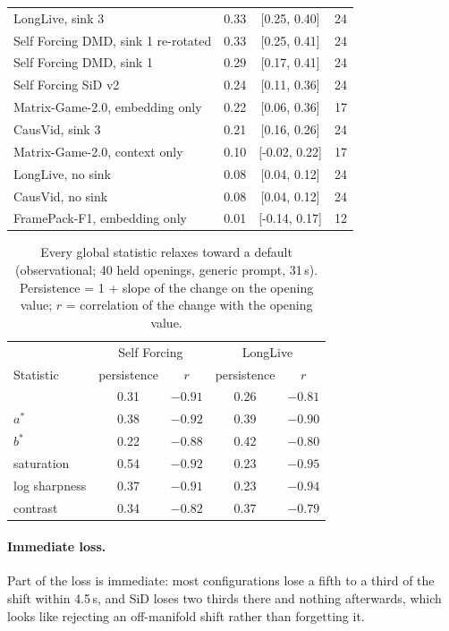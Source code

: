 \begin{table}[h]
\begin{tabular}{@{}lccc@{}}
LongLive, sink 3 & 0.33 & [0.25, 0.40] & 24 \\
Self Forcing DMD, sink 1 re-rotated & 0.33 & [0.25, 0.41] & 24 \\
Self Forcing DMD, sink 1 & 0.29 & [0.17, 0.41] & 24 \\
Self Forcing SiD v2 & 0.24 & [0.11, 0.36] & 24 \\
Matrix-Game-2.0, embedding only & 0.22 & [0.06, 0.36] & 17 \\
CausVid, sink 3 & 0.21 & [0.16, 0.26] & 24 \\
Matrix-Game-2.0, context only & 0.10 & [-0.02, 0.22] & 17 \\
LongLive, no sink & 0.08 & [0.04, 0.12] & 24 \\
CausVid, no sink & 0.08 & [0.04, 0.12] & 24 \\
FramePack-F1, embedding only & 0.01 & [-0.14, 0.17] & 12 \\
\bottomrule
\end{tabular}
\end{table}

\begin{table}[h]
\centering\small
\caption{Every global statistic relaxes toward a default (observational; 40 held openings, generic prompt, 31\,s).
Persistence = 1 + slope of the change on the opening value; $r$ = correlation of the change with the opening value.}
\label{tab:attr}
\begin{tabular}{lcccc}
\toprule
& \multicolumn{2}{c}{Self Forcing} & \multicolumn{2}{c}{LongLive} \\
Statistic & persistence & $r$ & persistence & $r$ \\
\midrule
\Lstar{} & 0.31 & $-0.91$ & 0.26 & $-0.81$ \\
$a^*$ & 0.38 & $-0.92$ & 0.39 & $-0.90$ \\
$b^*$ & 0.22 & $-0.88$ & 0.42 & $-0.80$ \\
saturation & 0.54 & $-0.92$ & 0.23 & $-0.95$ \\
log sharpness & 0.37 & $-0.91$ & 0.23 & $-0.94$ \\
\Lstar{} contrast & 0.34 & $-0.82$ & 0.37 & $-0.79$ \\
\bottomrule
\end{tabular}
\end{table}

\paragraph{Immediate loss.} Part of the loss is immediate: most configurations lose a fifth to a third of the
shift within 4.5\,s, and SiD loses two thirds there and nothing afterwards, which looks like rejecting an off-manifold
shift rather than forgetting it.

